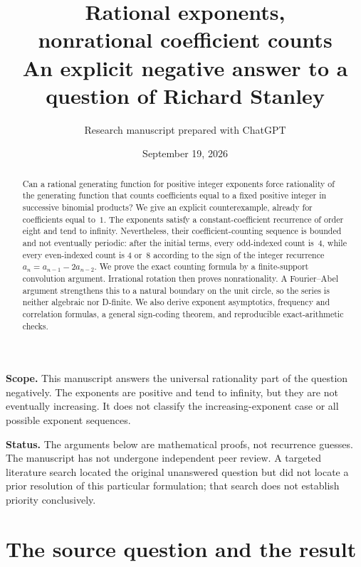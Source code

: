 \documentclass[11pt]{article}
\title{\vspace{-1.2cm}\color{Ink}\textbf{Rational exponents,\\nonrational coefficient counts}\\[0.5em]
\large An explicit negative answer to a question of Richard Stanley}
\author{Research manuscript prepared with ChatGPT}
\date{September 19, 2026}
\theoremstyle{definition}\newtheorem{definition}[theorem]{Definition}
\theoremstyle{remark}\newtheorem{remark}[theorem]{Remark}
\begin{document}
\maketitle
\begin{abstract}
Can a rational generating function for positive integer exponents force rationality of the generating function that counts coefficients equal to a fixed positive integer in successive binomial products? We give an explicit counterexample, already for coefficients equal to~$1$. The exponents satisfy a constant-coefficient recurrence of order eight and tend to infinity. Nevertheless, their coefficient-counting sequence is bounded and not eventually periodic: after the initial terms, every odd-indexed count is~$4$, while every even-indexed count is $4$ or~$8$ according to the sign of the integer recurrence $a_n=a_{n-1}-2a_{n-2}$. We prove the exact counting formula by a finite-support convolution argument. Irrational rotation then proves nonrationality. A Fourier--Abel argument strengthens this to a natural boundary on the unit circle, so the series is neither algebraic nor D-finite. We also derive exponent asymptotics, frequency and correlation formulas, a general sign-coding theorem, and reproducible exact-arithmetic checks.
\end{abstract}

\begin{resultbox}
\textbf{Scope.} This manuscript answers the universal rationality part of the question negatively. The exponents are positive and tend to infinity, but they are not eventually increasing. It does not classify the increasing-exponent case or all possible exponent sequences.

\textbf{Status.} The arguments below are mathematical proofs, not recurrence guesses. The manuscript has not undergone independent peer review. A targeted literature search located the original unanswered question but did not locate a prior resolution of this particular formulation; that search does not establish priority conclusively.
\end{resultbox}

\begingroup
\small
\setlength{\parskip}{0pt}
\makeatletter
\renewcommand{\l@section}[2]{\@dottedtocline{1}{0em}{1.8em}{\bfseries #1}{#2}}
\makeatother
\tableofcontents
\endgroup
\clearpage

\section{The source question and the result}
\end{document}
